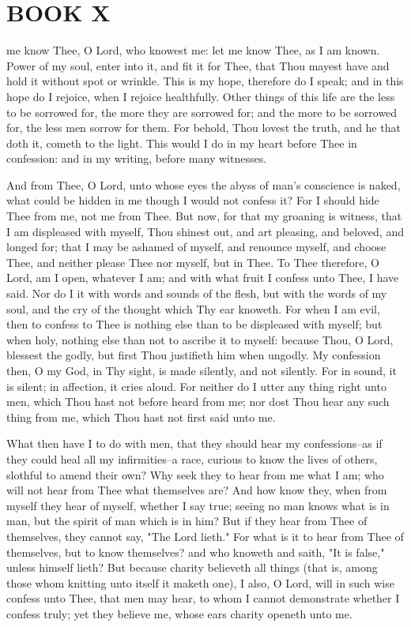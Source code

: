 \documentclass[b5paper,openright,12pt,twoside]{book}
\begin{document}
\chapter{BOOK X}


 me know Thee, O Lord, who knowest me: let me know Thee, as I am
known. Power of my soul, enter into it, and fit it for Thee, that
Thou mayest have and hold it without spot or wrinkle. This is my hope,
therefore do I speak; and in this hope do I rejoice, when I rejoice
healthfully. Other things of this life are the less to be sorrowed for,
the more they are sorrowed for; and the more to be sorrowed for, the
less men sorrow for them. For behold, Thou lovest the truth, and he that
doth it, cometh to the light. This would I do in my heart before Thee in
confession: and in my writing, before many witnesses.

And from Thee, O Lord, unto whose eyes the abyss of man's conscience is
naked, what could be hidden in me though I would not confess it? For
I should hide Thee from me, not me from Thee. But now, for that my
groaning is witness, that I am displeased with myself, Thou shinest out,
and art pleasing, and beloved, and longed for; that I may be ashamed of
myself, and renounce myself, and choose Thee, and neither please Thee
nor myself, but in Thee. To Thee therefore, O Lord, am I open, whatever
I am; and with what fruit I confess unto Thee, I have said. Nor do I it
with words and sounds of the flesh, but with the words of my soul, and
the cry of the thought which Thy ear knoweth. For when I am evil, then
to confess to Thee is nothing else than to be displeased with myself;
but when holy, nothing else than not to ascribe it to myself: because
Thou, O Lord, blessest the godly, but first Thou justifieth him when
ungodly. My confession then, O my God, in Thy sight, is made silently,
and not silently. For in sound, it is silent; in affection, it cries
aloud. For neither do I utter any thing right unto men, which Thou hast
not before heard from me; nor dost Thou hear any such thing from me,
which Thou hast not first said unto me.

What then have I to do with men, that they should hear my
confessions--as if they could heal all my infirmities--a race, curious
to know the lives of others, slothful to amend their own? Why seek they
to hear from me what I am; who will not hear from Thee what themselves
are? And how know they, when from myself they hear of myself, whether
I say true; seeing no man knows what is in man, but the spirit of man
which is in him? But if they hear from Thee of themselves, they cannot
say, "The Lord lieth." For what is it to hear from Thee of themselves,
but to know themselves? and who knoweth and saith, "It is false," unless
himself lieth? But because charity believeth all things (that is, among
those whom knitting unto itself it maketh one), I also, O Lord, will
in such wise confess unto Thee, that men may hear, to whom I cannot
demonstrate whether I confess truly; yet they believe me, whose ears
charity openeth unto me.
\end{document}
